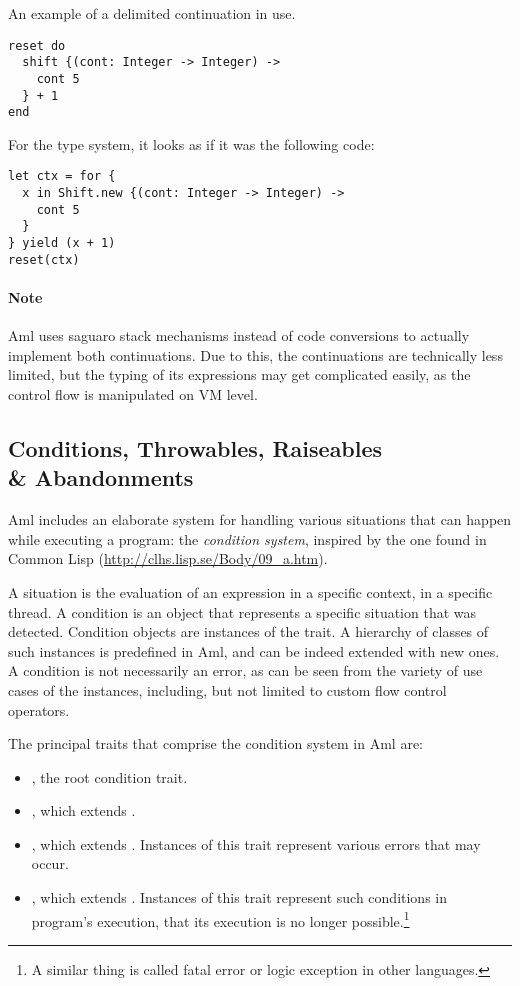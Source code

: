 \example An example of a delimited continuation in use. 
\begin{lstlisting}
reset do
  shift {(cont: Integer -> Integer) ->
    cont 5
  } + 1
end
\end{lstlisting}
For the type system, it looks as if it was the following code:
\begin{lstlisting}
let ctx = for {
  x in Shift.new {(cont: Integer -> Integer) ->
    cont 5
  }
} yield (x + 1)
reset(ctx)
\end{lstlisting}

\paragraph{Note}
Aml uses saguaro stack mechanisms instead of code conversions to actually implement both continuations. Due to this, the continuations are technically less limited, but the typing of its expressions may get complicated easily, as the control flow is manipulated on VM level.






\subsection[Conditions, Throwables, Raiseables \& Abandonments]{Conditions, Throwables, Raiseables\\\& Abandonments}

Aml includes an elaborate system for handling various situations that can happen while executing a program: the {\em condition system}, inspired by the one found in Common Lisp (\url{http://clhs.lisp.se/Body/09_a.htm}). 

A situation is the evaluation of an expression in a specific context, in a specific thread. A condition is an object that represents a specific situation that was detected. Condition objects are instances of the  trait. A hierarchy of classes of such instances is predefined in Aml, and can be indeed extended with new ones. A condition is not necessarily an error, as can be seen from the variety of use cases of the instances, including, but not limited to custom flow control operators. 

The principal traits that comprise the condition system in Aml are: 
\begin{itemize}
  \item {}, the root condition trait. 
  \item {}, which extends . 
  \item {}, which extends . Instances of this trait represent various errors that may occur. 
  \item {}, which extends . Instances of this trait represent such conditions in program's execution, that its execution is no longer possible.\footnote{A similar thing is called fatal error or logic exception in other languages.}
\end{itemize}

